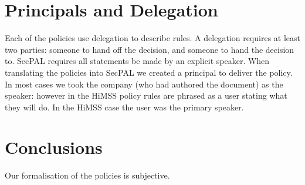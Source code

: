 \documentclass[conference,twocolumn]{IEEEtran}
\begin{document}
\section{Principals and Delegation}

Each of the policies use delegation to describe rules.
A delegation requires at least two parties: someone to hand off the decision, and someone to hand the decision to.
SecPAL requires all statements be made by an explicit speaker.
When translating the policies into SecPAL we created a principal to deliver the policy.
In most cases we took the company (who had authored the document) as the speaker: however in the HiMSS policy rules are phrased as a user stating what they will do.
In the HiMSS case the user was the primary speaker.


\section{Conclusions}
\label{sec:conclusions}

Our formalisation of the policies is subjective.

\printbibliography{}
\end{document}
